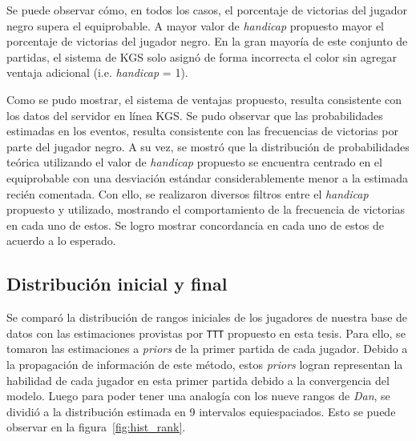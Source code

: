 \documentclass[11pt,twoside, spanish]{report} %
\begin{document}
Se puede observar c\'omo, en todos los casos, el porcentaje de victorias del jugador negro supera el equiprobable. 
A mayor valor de \textit{handicap} propuesto mayor el porcentaje de victorias del jugador negro.
En la gran mayor\'ia de este conjunto de partidas, el sistema de KGS solo asign\'o de forma incorrecta el color sin agregar ventaja adicional (i.e. \textit{handicap} = 1).

Como se pudo mostrar, el sistema de ventajas propuesto, resulta consistente con los datos del servidor en l\'inea KGS.
Se pudo observar que las probabilidades estimadas en los eventos, resulta consistente con las frecuencias de victorias por parte del jugador negro.
A su vez, se mostr\'o que la distribuci\'on de probabilidades te\'orica utilizando el valor de \textit{handicap} propuesto se encuentra centrado en el equiprobable con una desviaci\'on est\'andar considerablemente menor a la estimada reci\'en comentada.
Con ello, se realizaron diversos filtros entre el \textit{handicap} propuesto y utilizado, mostrando el comportamiento de la frecuencia de victorias en cada uno de estos.
Se logro mostrar concordancia en cada uno de estos de acuerdo a lo esperado.







\vspace{7cm}
\subsection{Distribuci\'on inicial y final}

Se compar\'o la distribuci\'on de rangos iniciales de los jugadores de nuestra base de datos con las estimaciones provistas por \texttt{TTT} propuesto en esta tesis.
Para ello, se tomaron las estimaciones a \textit{priors} de la primer partida de cada jugador.
Debido a la propagaci\'on de informaci\'on de este m\'etodo, estos \textit{priors} logran representan la habilidad de cada jugador en esta primer partida debido a la convergencia del modelo.
Luego para poder tener una analog\'ia con los nueve rangos de \textit{Dan}, se dividi\'o a la distribuci\'on estimada en 9 intervalos equiespaciados.
Esto se puede observar en la figura~\ref{fig:hist_rank}.
\end{document}
